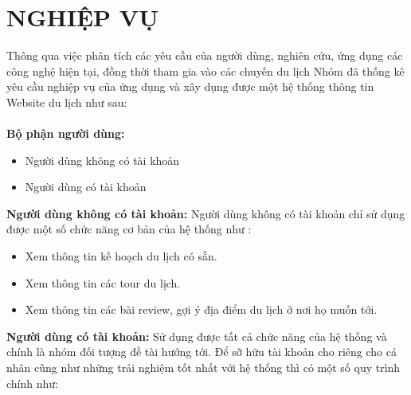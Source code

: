 \section{NGHIỆP VỤ}

Thông qua việc phân tích các yêu cầu của người dùng, nghiên cứu, ứng dụng các công nghệ hiện tại, đồng thời tham gia vào các chuyến du lịch Nhóm đã thống kê yêu cầu nghiệp vụ của ứng dụng và  xây dụng được một hệ thống thông tin Website du lịch như sau: 
\\
\\
\textbf{Bộ phận người dùng: } 
\begin{itemize}
    \item Người dùng không có tài khoản 
    \item Người dùng có tài khoản
\end{itemize}
\textbf{Người dùng không có tài khoản: }
Người dùng không có tài khoản chỉ sử dụng được một số chức năng cơ bản của hệ thống như : 
\begin{itemize}
    \item Xem thông tin kế hoạch du lịch có sẵn.
    \item Xem thông tin các tour du lịch.
    \item Xem thông tin các bài review, gợi ý địa điểm du lịch ở nơi họ muốn tới.
\end{itemize}
\textbf{Người dùng có tài khoản:} Sử dụng được tất cả chức năng của hệ thống và chính là nhóm đối tượng đề tài hướng tới. Để sỡ hữu tài khoản cho riêng cho cá nhân cũng như những trải nghiệm tốt nhất với hệ thống thì có một số quy trình chính như: 

